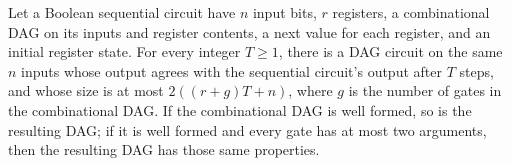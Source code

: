 \begin{theorem}
\label{BoolCircuit.SeqCircuit.exists_dagCircuit_of_run}
\leanok
{}
Let a Boolean sequential circuit have $n$ input bits, $r$ registers, a combinational DAG
on its inputs and register contents, a next value for each register, and an initial
register state. For every integer $T\ge 1$, there is a DAG circuit on the same $n$
inputs whose output agrees with the sequential circuit's output after $T$ steps, and
whose size is at most $2((r+g)T+n)$, where $g$ is the number of gates in the
combinational DAG. If the combinational DAG is well formed, so is the resulting DAG; if
it is well formed and every gate has at most two arguments, then the resulting DAG has
those same properties.
\end{theorem}
